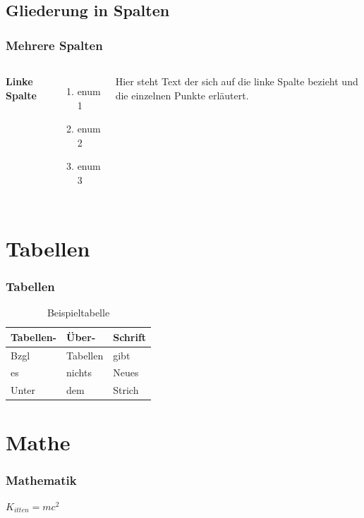 \documentclass{beamer}
\begin{document}
\subsection{Gliederung in Spalten}

\begin{frame}
\frametitle{Mehrere Spalten}
\begin{columns}[c] %

\textbf{Linke Spalte}
\begin{enumerate}
\item enum 1
\item enum 2
\item enum 3
\end{enumerate}

Hier steht Text der sich auf die linke Spalte bezieht und die einzelnen Punkte erläutert.

\end{columns}
\end{frame}

\section{Tabellen}

\begin{frame}
\frametitle{Tabellen}
\begin{table}
\begin{tabular}{lll}
\toprule
\textbf{Tabellen-} & \textbf{Über-} & \textbf{Schrift} \\
\midrule
Bzgl & Tabellen & gibt \\
es & nichts & Neues \\
\bottomrule
Unter & dem & Strich \\
\end{tabular}
\caption{Beispieltabelle}
\end{table}
\end{frame}

\section{Mathe}

\begin{frame}
\frametitle{Mathematik}
\begin{theorem}
$K_{itten} = mc^2$
\end{theorem}
\end{frame}
\end{document}
